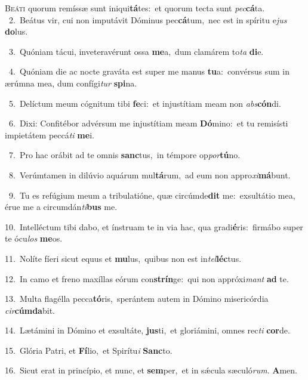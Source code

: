 \lettrine{\initial\textcolor{\initialcolor}{B}}{eáti} quorum remíssæ sunt iniqui\-\textbf{tá}\-tes:~\star et quorum tecta sunt \textit{pec}\-\textbf{cá}ta.\\
{\numbfont\textcolor{\numbcolor}{~2.}}~Beátus vir, cui non imputávit Dóminus pec\-\textbf{cá}\-tum,~\star nec est in spíritu e\textit{jus} \textbf{do}\-lus.\par
{\numbfont\textcolor{\numbcolor}{~3.}}~Quóniam tácui, inveteravérunt ossa \textbf{me}\-a,~\star dum clamárem to\textit{ta} \textbf{di}\-e.\par
{\numbfont\textcolor{\numbcolor}{~4.}}~Quóniam die ac nocte graváta est super me manus \textbf{tu}\-a:~\star convérsus sum in ærúmna mea, dum confígi\textit{tur} \textbf{spi}\-na.\par
{\numbfont\textcolor{\numbcolor}{~5.}}~Delíctum meum cógnitum tibi \textbf{fe}\-ci:~\star et injustítiam meam non \textit{abs}\-\textbf{cón}di.\par
{\numbfont\textcolor{\numbcolor}{~6.}}~Dixi: Confitébor advérsum me injustítiam meam \textbf{Dó}\-mino:~\star et tu remisísti impietátem peccá\textit{ti} \textbf{me}\-i.\par
{\numbfont\textcolor{\numbcolor}{~7.}}~Pro hac orábit ad te omnis \textbf{sanc}\-tus,~\star in témpore op\-\textit{por}\-\textbf{tú}no.\par
{\numbfont\textcolor{\numbcolor}{~8.}}~Verúmtamen in dilúvio aquárum mul\-\textbf{tá}\-rum,~\star ad eum non appro\-\textit{xi}\-\textbf{má}bunt.\par
{\numbfont\textcolor{\numbcolor}{~9.}}~Tu es refúgium meum a tribulatióne, quæ circúmde\textbf{dit} me:~\star exsultátio mea, érue me a circumdán\-\textit{ti}\-\textbf{bus} me.\par
{\numbfont\textcolor{\numbcolor}{10.}}~Intelléctum tibi dabo, et ínstruam te in via hac, qua gradi\-\textbf{é}\-ris:~\star firmábo super te ócu\textit{los} \textbf{me}\-os.\par
{\numbfont\textcolor{\numbcolor}{11.}}~Nolíte fíeri sicut equus et \textbf{mu}\-lus,~\star quibus non est in\-\textit{tel}\-\textbf{léc}tus.\par
{\numbfont\textcolor{\numbcolor}{12.}}~In camo et freno maxíllas eórum con\-\textbf{strín}\-ge:~\star qui non appróxi\textit{mant} \textbf{ad} te.\par
{\numbfont\textcolor{\numbcolor}{13.}}~Multa flagélla pecca\-\textbf{tó}\-ris,~\star sperántem autem in Dómino misericórdia \textit{cir}\-\textbf{cúm}\textbf{da}bit.\par
{\numbfont\textcolor{\numbcolor}{14.}}~Lætámini in Dómino et exsultáte, \textbf{jus}\-ti,~\star et gloriámini, omnes rec\textit{ti} \textbf{cor}\-de.\par
{\numbfont\textcolor{\numbcolor}{15.}}~Glória Patri, et \textbf{Fí}\-lio,~\star et Spirítu\textit{i} \textbf{Sanc}\-to.\par
{\numbfont\textcolor{\numbcolor}{16.}}~Sicut erat in princípio, et nunc, et \textbf{sem}\-per,~\star et in sǽcula sæculó\-\textit{rum}\-. \textbf{A}\-men.\par

